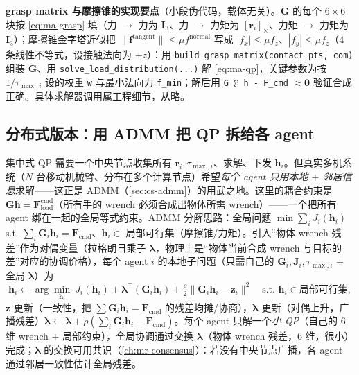 \noindent\textbf{grasp matrix 与摩擦锥的实现要点}（小段伪代码，载体无关）。$\mathbf{G}$ 的每个 $6\times6$ 块按 \cref{eq:ma-grasp} 填（力 $\to$ 力为 $\mathbf{I}_3$、力 $\to$ 力矩为 $[\mathbf{r}_i]_\times$、力矩 $\to$ 力矩为 $\mathbf{I}_3$）；摩擦锥金字塔近似把 $\|\mathbf{f}^{\text{tangent}}\|\le\mu f^{\text{normal}}$ 写成 $|f_x|\le\mu f_z$、$|f_y|\le\mu f_z$（$4$ 条线性不等式，设接触法向为 $+z$）：用 \verb|build_grasp_matrix(contact_pts, com)| 组装 $\mathbf{G}$、用 \verb|solve_load_distribution(...)| 解 \cref{eq:ma-qp}，关键参数为按 $1/\tau_{\max,i}$ 设的权重 \verb|w| 与最小法向力 \verb|f_min|；解后用 \verb|G @ h - F_cmd| $\approx\mathbf{0}$ 验证合成正确。具体求解器调用属工程细节，从略。

\subsection{分布式版本：用 ADMM 把 QP 拆给各 agent}
\label{sec:ma-admm}

集中式 QP 需要一个中央节点收集所有 $\mathbf{r}_i,\tau_{\max,i}$、求解、下发 $\mathbf{h}_i$。但真实多机系统（$N$ 台移动机械臂、分布在多个计算节点）希望\emph{每个 agent 只用本地 $+$ 邻居信息}求解——这正是 ADMM（\cref{sec:cs-admm}）的用武之地。这里的耦合约束是 $\mathbf{G}\mathbf{h}=\mathbf{F}_{\text{load}}^{\text{cmd}}$（所有手的 wrench 必须合成出物体所需 wrench）——一个把所有 agent 绑在一起的全局等式约束。ADMM 分解思路：全局问题 $\min\sum_i J_i(\mathbf{h}_i)$ s.t. $\sum_i\mathbf{G}_i\mathbf{h}_i=\mathbf{F}_{\text{cmd}}$、$\mathbf{h}_i\in$ 局部可行集（摩擦锥/力矩）。引入“物体 wrench 残差”作为对偶变量（拉格朗日乘子 $\boldsymbol{\lambda}$，物理上是“物体当前合成 wrench 与目标的差”对应的协调价格），每个 agent $i$ 的本地子问题（只需自己的 $\mathbf{G}_i,\mathbf{J}_i,\tau_{\max,i}$ $+$ 全局 $\boldsymbol{\lambda}$）为
\begin{equation}
  \mathbf{h}_i\leftarrow\arg\min_{\mathbf{h}_i}\ J_i(\mathbf{h}_i)+\boldsymbol{\lambda}^\top(\mathbf{G}_i\mathbf{h}_i)+\tfrac{\rho}{2}\|\mathbf{G}_i\mathbf{h}_i-\mathbf{z}_i\|^2
  \quad\text{s.t. }\mathbf{h}_i\in\text{局部可行集},
  \label{eq:ma-admm-local}
\end{equation}
$\mathbf{z}$ 更新（一致性，把 $\sum\mathbf{G}_i\mathbf{h}_i=\mathbf{F}_{\text{cmd}}$ 的残差均摊/协商），$\boldsymbol{\lambda}$ 更新（对偶上升，广播残差）$\boldsymbol{\lambda}\leftarrow\boldsymbol{\lambda}+\rho(\sum_i\mathbf{G}_i\mathbf{h}_i-\mathbf{F}_{\text{cmd}})$。每个 agent 只解一个\emph{小 QP}（自己的 $6$ 维 wrench $+$ 局部约束），全局协调通过交换 $\boldsymbol{\lambda}$（物体 wrench 残差，$6$ 维，很小）完成；$\boldsymbol{\lambda}$ 的交换可用共识（\cref{ch:mr-consensus}）：若没有中央节点广播，各 agent 通过邻居一致性估计全局残差。

